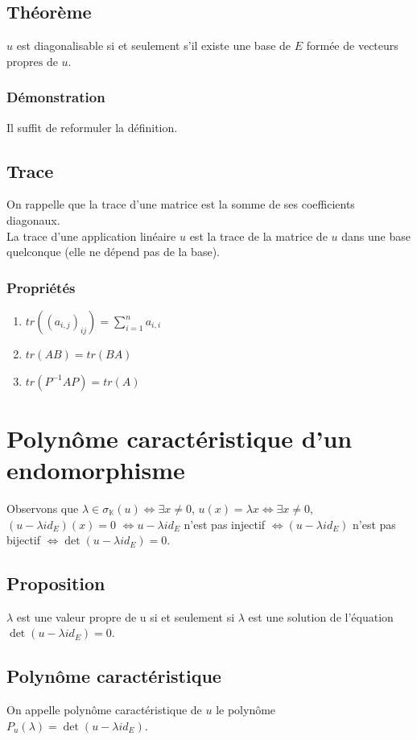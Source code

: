 \documentclass[a4paper,10pt]{book} %
\newcommand{\K}{\mathbb{K}}
\begin{document}
\subsection{Théorème}
$u$ est diagonalisable si et seulement s'il existe une base de $E$ formée de vecteurs $\text{propres de }u.$

\subsubsection{Démonstration}
Il suffit de reformuler la définition.

\subsection{Trace}
On rappelle que la trace d'une matrice est la somme de ses coefficients diagonaux.\\

La trace d'une application linéaire $u$ est la trace de la matrice de $u$ dans une base quelconque (elle ne dépend pas de la base).

\subsubsection{Propriétés}
\begin{enumerate}
\item $tr((a_{i,j})_{ij})=\sum_{i=1}^n a_{i,i}$
\item $tr(AB)=tr(BA)$
\item $tr(P^{-1}AP)=tr(A)$
\end{enumerate}
\section{Polynôme caractéristique d'un endomorphisme}
Observons que $\lambda\in \sigma_\K(u)\Leftrightarrow \exists x\neq 0$, $u(x)=\lambda x \Leftrightarrow \exists x\neq 0$, $(u-\lambda id_E)(x)=0$ $\Leftrightarrow u-\lambda id_E$ n'est pas injectif $\Leftrightarrow(u-\lambda id_E)$ n'est pas bijectif $\Leftrightarrow \det(u-\lambda id_E)=0$.

\subsection{Proposition}
$\lambda$ est une valeur propre de u si et seulement si $\lambda$ est une solution de l'équation $\det(u-\lambda id_E)=0$.

\subsection{Polynôme caractéristique}
On appelle polynôme caractéristique de $u$ le polynôme $P_u(\lambda)=\det(u-\lambda id_E)$.\\
\end{document}
